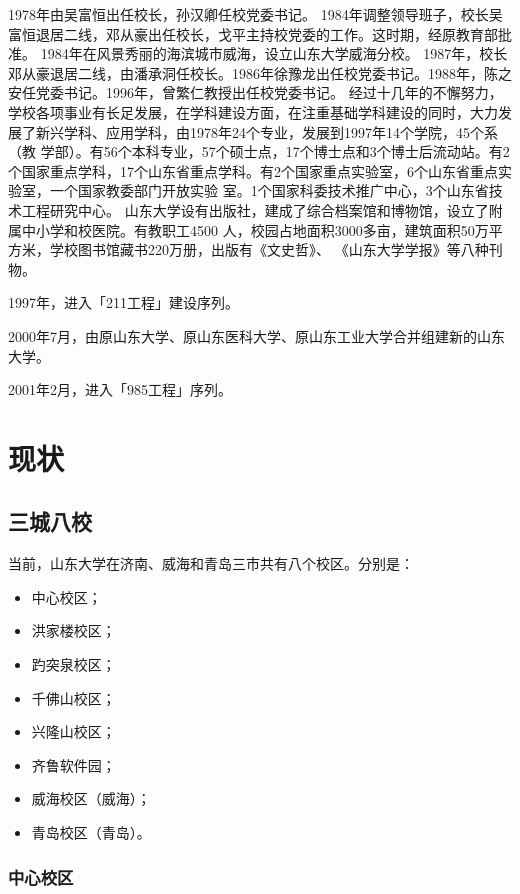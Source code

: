 \documentclass{sduthesis}
\begin{document}
1978年由吴富恒出任校长，孙汉卿任校党委书记。 1984年调整领导班子，校长吴富恒退居二线，邓从豪出任校长，戈平主持校党委的工作。这时期，经原教育部批准。 1984年在风景秀丽的海滨城市威海，设立山东大学威海分校。 1987年，校长邓从豪退居二线，由潘承洞任校长。1986年徐豫龙出任校党委书记。1988年，陈之安任党委书记。1996年，曾繁仁教授出任校党委书记。 经过十几年的不懈努力，学校各项事业有长足发展，在学科建设方面，在注重基础学科建设的同时，大力发展了新兴学科、应用学科，由1978年24个专业，发展到1997年14个学院，45个系（教 学部）。有56个本科专业，57个硕士点，17个博士点和3个博士后流动站。有2个国家重点学科，17个山东省重点学科。有2个国家重点实验室，6个山东省重点实验室，一个国家教委部门开放实验 室。1个国家科委技术推广中心，3个山东省技术工程研究中心。 山东大学设有出版社，建成了综合档案馆和博物馆，设立了附属中小学和校医院。有教职工4500 人，校园占地面积3000多亩，建筑面积50万平方米，学校图书馆藏书220万册，出版有《文史哲》、 《山东大学学报》等八种刊物。

1997年，进入「211工程」建设序列。

2000年7月，由原山东大学、原山东医科大学、原山东工业大学合并组建新的山东大学。

2001年2月，进入「985工程」序列。

\chapter{现状}

\section{三城八校}

当前，山东大学在济南、威海和青岛三市共有八个校区。分别是：

\begin{itemize}
  \item 中心校区；
  \item 洪家楼校区；
  \item 趵突泉校区；
  \item 千佛山校区；
  \item 兴隆山校区；
  \item 齐鲁软件园；
  \item 威海校区（威海）；
  \item 青岛校区（青岛）。
\end{itemize}

\subsection{中心校区}
\end{document}

